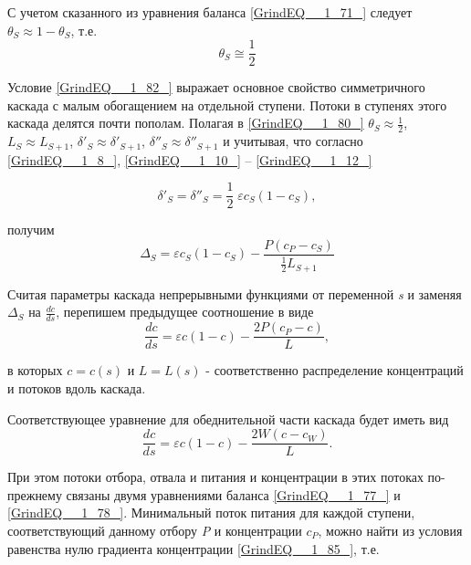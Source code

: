 С учетом сказанного из уравнения баланса \ref{GrindEQ__1_71_} следует $\theta _{S} \approx 1-\theta _{S} $, т.е.
\begin{equation} \label{GrindEQ__1_82_} 
\theta _{S} \cong \frac{1}{2}  
\end{equation} 

Условие \ref{GrindEQ__1_82_} выражает основное свойство симметричного каскада с малым обогащением на отдельной ступени. Потоки в ступенях этого каскада делятся почти пополам. Полагая в \ref{GrindEQ__1_80_} $\theta _{S} \approx \frac{1}{2} $, $L_{S} \approx L_{S+1} $, $\delta '_{S} \approx \delta '_{S+1} $, $\delta ''_{S} \approx \delta ''_{S+1} $ и учитывая, что согласно \ref{GrindEQ__1_8_}, \ref{GrindEQ__1_10_} -- \ref{GrindEQ__1_12_}

\begin{equation} \label{GrindEQ__1_83_} 
\delta '_{S} =\delta ''_{S} =\frac{1}{2} \mathrm{\; }\varepsilon c_{S} (1-c_{S} ),                    
\end{equation} 

получим
\begin{equation} \label{GrindEQ__1_84_} 
\Delta _{S} =\varepsilon c_{S} (1-c_{S} )-\frac{P(c_{P} -c_{S} )}{\frac{1}{2} L_{S+1} }  
\end{equation} 

Считая параметры каскада непрерывными функциями от переменной \textit{s} и заменяя $\Delta _{S} $ на $\frac{dc}{ds} $, перепишем предыдущее соотношение в виде
\begin{equation} \label{GrindEQ__1_85_} 
\frac{dc}{ds} =\varepsilon c(1-c)-\frac{2P(c_{P} -c)}{L} ,                    
\end{equation} 

в которых $c=c(s)$ и $L=L(s)$ - соответственно распределение концентраций и потоков вдоль каскада. 

Соответствующее уравнение для обеднительной части каскада будет иметь вид
\begin{equation} \label{GrindEQ__1_86_} 
\frac{dc}{ds} =\varepsilon c(1-c)-\frac{2W(c-c_{W} )}{L} .                     
\end{equation} 

При этом потоки отбора, отвала и питания и концентрации в этих потоках по-прежнему связаны двумя уравнениями баланса \ref{GrindEQ__1_77_} и \ref{GrindEQ__1_78_}. Минимальный поток питания для каждой ступени, соответствующий данному отбору \textit{P} и концентрации $c_{P} $, можно найти из условия равенства нулю градиента концентрации \ref{GrindEQ__1_85_}, т.е.

